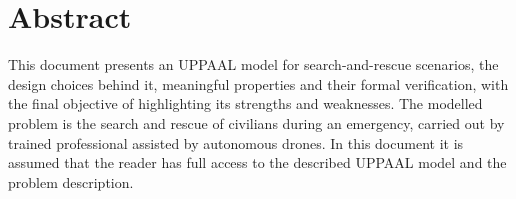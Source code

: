 
\section{Abstract}
This document presents an UPPAAL model for search-and-rescue scenarios, the design choices behind it, meaningful properties and their formal verification, with the final objective of highlighting its strengths and weaknesses. The modelled problem is the search and rescue of civilians during an emergency, carried out by trained professional assisted by autonomous drones.
In this document it is assumed that the reader has full access to the described UPPAAL model and the problem description.